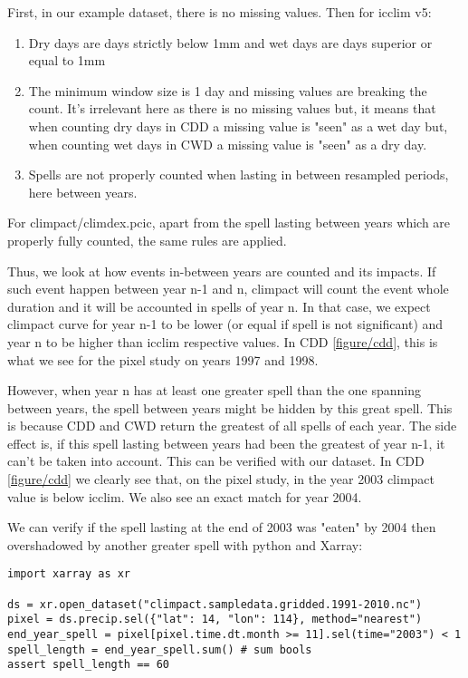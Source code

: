 \documentclass[a4paper,11pt]{article}
\begin{document}
            First, in our example dataset, there is no missing values.
            Then for icclim v5:
            \begin{enumerate}
                \item Dry days are days strictly below 1mm and wet days are days superior or equal to 1mm
                \item The minimum window size is 1 day and missing values are breaking the count. 
                    It's irrelevant here as there is no missing values but, it means that when counting dry days in CDD a missing value is "seen" as a wet day but, when counting wet days in CWD a missing value is "seen" as a dry day.
                \item Spells are not properly counted when lasting in between resampled periods, here between years.
            \end{enumerate}
            For climpact/climdex.pcic, apart from the spell lasting between years which are properly fully counted, the same rules are applied.
            
            Thus, we look at how events in-between years are counted and its impacts.
            If such event happen between year n-1 and n, climpact will count the event whole duration and it will be accounted in spells of year n.
            In that case, we expect climpact curve for year n-1 to be lower (or equal if spell is not significant) and year n to be higher than icclim respective values.
            In CDD \ref{figure/cdd}, this is what we see for the pixel study on years 1997 and 1998.

            However, when year n has at least one greater spell than the one spanning between years, the spell between years might be hidden by this great spell.
            This is because CDD and CWD return the greatest of all spells of each year.
            The side effect is, if this spell lasting between years had been the greatest of year n-1, it can't be taken into account.
            This can be verified with our dataset. In CDD \ref{figure/cdd} we clearly see that, on the pixel study, in the year 2003 climpact value is below icclim.
            We also see an exact match for year 2004.
            
            We can verify if the spell lasting at the end of 2003 was "eaten" by 2004 then overshadowed by another greater spell with python and Xarray:
            \begin{minipage}{\linewidth}
            \begin{lstlisting}
import xarray as xr

ds = xr.open_dataset("climpact.sampledata.gridded.1991-2010.nc")
pixel = ds.precip.sel({"lat": 14, "lon": 114}, method="nearest")
end_year_spell = pixel[pixel.time.dt.month >= 11].sel(time="2003") < 1
spell_length = end_year_spell.sum() # sum bools
assert spell_length == 60
            \end{lstlisting}
            \end{minipage}
\end{document}
